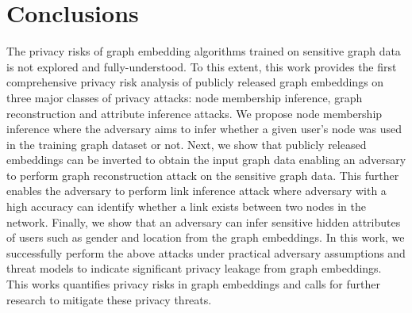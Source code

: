 \section{Conclusions}\label{conclusions}


The privacy risks of graph embedding algorithms trained on sensitive graph data is not explored and fully-understood.
To this extent, this work provides the first comprehensive privacy risk analysis of publicly released graph embeddings on three major classes of privacy attacks: node membership inference, graph reconstruction and attribute inference attacks.
We propose node membership inference where the adversary aims to infer whether a given user's node was used in the training graph dataset or not.
Next, we show that publicly released embeddings can be inverted to obtain the input graph data enabling an adversary to perform graph reconstruction attack on the sensitive graph data.
This further enables the adversary to perform link inference attack where adversary with a high accuracy can identify whether a link exists between two nodes in the network.
Finally, we show that an adversary can infer sensitive hidden attributes of users such as gender and location from the graph embeddings.
In this work, we successfully perform the above attacks under practical adversary assumptions and threat models to indicate significant privacy leakage from graph embeddings.
This works quantifies privacy risks in graph embeddings and calls for further research to mitigate these privacy threats.
